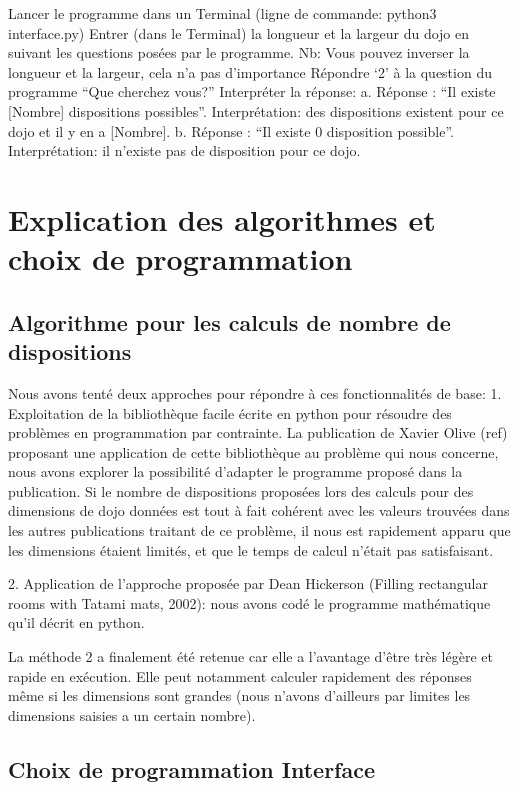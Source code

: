 Lancer le programme dans un Terminal (ligne de commande: python3 interface.py)
Entrer (dans le Terminal) la longueur et la largeur du dojo en suivant les questions posées par le programme. Nb: Vous pouvez inverser la longueur et la largeur, cela n’a pas d’importance
Répondre ‘2’ à la question du programme “Que cherchez vous?”
Interpréter la réponse:
a. Réponse : “Il existe [Nombre] dispositions possibles”. Interprétation: des dispositions existent pour ce dojo et il y en a [Nombre].
b. Réponse : “Il existe 0 disposition possible”. Interprétation: il n’existe pas de disposition pour ce dojo.


\section{Explication des algorithmes et choix de programmation}

\subsection{Algorithme pour les calculs de nombre de dispositions}

Nous avons tenté deux approches pour répondre à ces fonctionnalités de base:
1. Exploitation de la bibliothèque facile écrite en python pour résoudre des problèmes en programmation par contrainte. 
La publication de Xavier Olive (ref) proposant une application de cette  bibliothèque au problème qui nous concerne, 
nous avons explorer la possibilité d’adapter le programme proposé dans la publication. Si le nombre de dispositions 
proposées lors des calculs pour des dimensions de dojo données est tout à fait cohérent avec les valeurs trouvées 
dans les autres publications traitant de ce problème, il nous est rapidement apparu que les dimensions étaient limités, 
et que le temps de calcul n’était pas satisfaisant.

2. Application de l’approche proposée par Dean Hickerson (Filling rectangular rooms with Tatami mats, 2002): %
nous avons codé le programme mathématique qu’il décrit en python.

La méthode 2 a finalement été retenue car elle a l’avantage d'être très légère et rapide en exécution. 
Elle peut notamment calculer rapidement des réponses même si les dimensions sont grandes (nous n’avons d’ailleurs par 
limites les dimensions saisies a un certain nombre).


\subsection{Choix de programmation Interface}

